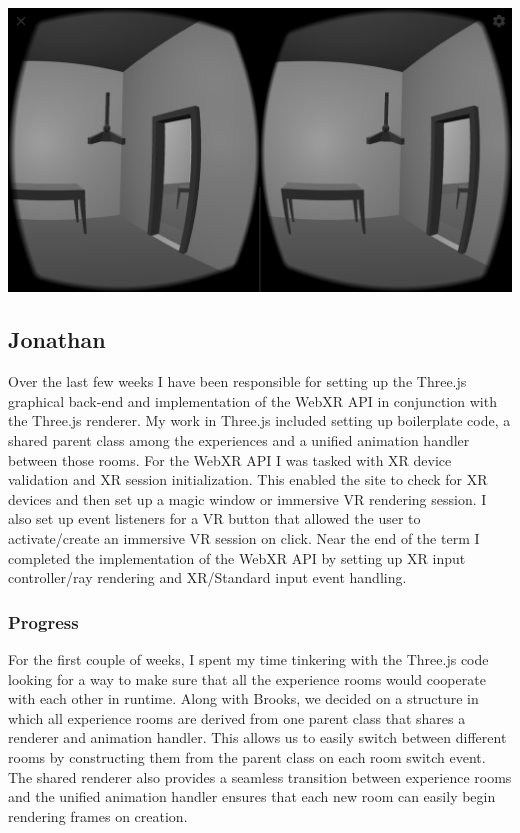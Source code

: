 \documentclass[onecolumn, draftclsnofoot,10pt, compsoc]{IEEEtran}
\begin{document}
\includegraphics[width=\linewidth]{images/pend-dragged.png}



\subsection{Jonathan}
Over the last few weeks I have been responsible for setting up the Three.js graphical back-end and implementation of the WebXR API in conjunction with the Three.js renderer. My work in Three.js included setting up boilerplate code, a shared parent class among the experiences and a unified animation handler between those rooms. For the WebXR API I was tasked with XR device validation and XR session initialization. This enabled the site to check for XR devices and then set up a magic window or immersive VR rendering session. I also set up event listeners for a VR button that allowed the user to activate/create an immersive VR session on click. Near the end of the term I completed the implementation of the WebXR API by setting up XR input controller/ray rendering and XR/Standard input event handling.

    \subsubsection{Progress}
    
    For the first couple of weeks, I spent my time tinkering with the Three.js code looking for a way to make sure that all the experience rooms would cooperate with each other in runtime. Along with Brooks, we decided on a structure in which all experience rooms are derived from one parent class that shares a renderer and animation handler. This allows us to easily switch between different rooms by constructing them from the parent class on each room switch event. The shared renderer also provides a seamless transition between experience rooms and the unified animation handler ensures that each new room can easily begin rendering frames on creation. 
    
\end{document}
